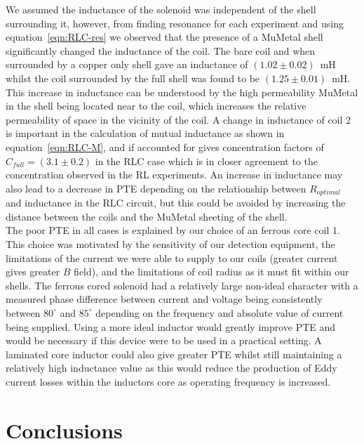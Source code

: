 \documentclass[11pt]{iopart}
\begin{document}
We assumed the inductance of the solenoid was independent of the shell
surrounding it, however, from finding resonance for each experiment
and using equation~\ref{eqn:RLC-res} we observed that the presence of
a MuMetal shell significantly changed the inductance of the coil. The
bare coil and when surrounded by a copper only shell gave an
inductance of $(1.02\pm0.02)$~mH whilst the coil surrounded by the
full shell was found to be $(1.25\pm0.01)$~mH.  This increase in
inductance can be understood by the high permeability MuMetal in the
shell being located near to the coil, which increases the relative
permeability of space in the vicinity of the coil. A change in
inductance of coil 2 is important in the calculation of mutual
inductance as shown in equation~\ref{eqn:RLC-M}, and if accounted for
gives concentration factors of $C_{full}=(3.1\pm0.2)$ in the RLC case
which is in closer agreement to the concentration observed in the RL
experiments. An increase in inductance may also lead to a decrease in
PTE depending on the relationship between $R_{optimal}$ and inductance
in the RLC circuit, but this could be avoided by increasing the
distance between the coils and the MuMetal sheeting of the shell.\\

The poor PTE in all cases is explained by our choice of an ferrous
core coil 1. This choice was motivated by the sensitivity of our
detection equipment, the limitations of the current we were able to
supply to our coils (greater current gives greater $B$ field), and the
limitations of coil radius as it must fit within our shells. The
ferrous cored solenoid had a relatively large non-ideal character with
a measured phase difference between current and voltage being
consistently between $80^\circ$ and $85^\circ$ depending on the
frequency and absolute value of current being supplied. Using a more
ideal inductor would greatly improve PTE and would be necessary if
this device were to be used in a practical setting. A laminated core
inductor could also give greater PTE whilst still maintaining a
relatively high inductance value as this would reduce the production
of Eddy current losses within the inductors core as operating
frequency is increased. \\

\section{Conclusions}
\end{document}
